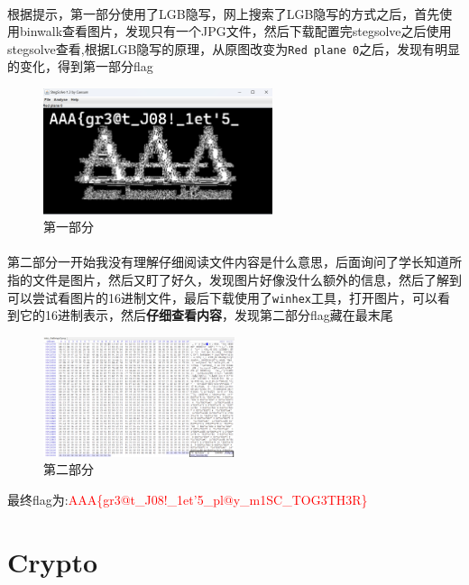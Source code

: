 \documentclass{article}
\begin{document}
\paragraph*{}根据提示，第一部分使用了LGB隐写，网上搜索了LGB隐写的方式之后，首先使用binwalk查看图片，发现只有一个JPG文件，然后下载配置完stegsolve之后使用stegsolve查看,根据LGB隐写的原理，从原图改变为\texttt{Red plane 0}之后，发现有明显的变化，得到第一部分flag
\begin{figure}[H]
    \centering
    \includegraphics[width=0.6\textwidth]{./figure/Part1.png}
    \caption{第一部分}
\end{figure}
\paragraph*{}第二部分一开始我没有理解仔细阅读文件内容是什么意思，后面询问了学长知道所指的文件是图片，然后又盯了好久，发现图片好像没什么额外的信息，然后了解到可以尝试看图片的16进制文件，最后下载使用了\texttt{winhex}工具，打开图片，可以看到它的16进制表示，然后\textbf{仔细查看内容}，发现第二部分flag藏在最末尾
\begin{figure}[H]
    \centering
    \includegraphics[width=0.5\textwidth]{./figure/part2.png}
    \caption{第二部分}
\end{figure}
最终flag为:\textcolor{red}{AAA\{gr3@t\_J08!\_1et'5_pl@y\_m1SC\_TOG3TH3R\}}
\section*{Crypto}
\end{document}
